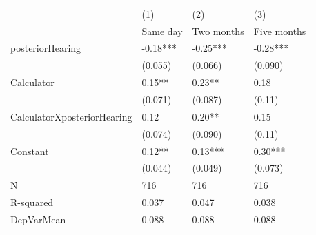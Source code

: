 \begin{tabular}{llll}
\toprule
      & (1)   & (2)   & (3) \\
      & Same day & Two months & Five months \\
\midrule
posteriorHearing & -0.18*** & -0.25*** & -0.28*** \\
      & (0.055) & (0.066) & (0.090) \\
Calculator & 0.15** & 0.23** & 0.18 \\
      & (0.071) & (0.087) & (0.11) \\
CalculatorXposteriorHearing & 0.12  & 0.20** & 0.15 \\
      & (0.074) & (0.090) & (0.11) \\
Constant & 0.12** & 0.13*** & 0.30*** \\
      & (0.044) & (0.049) & (0.073) \\
\midrule
N     & 716   & 716   & 716 \\
R-squared & 0.037 & 0.047 & 0.038 \\
DepVarMean & 0.088 & 0.088 & 0.088 \\
\bottomrule
\bottomrule
\end{tabular}%

